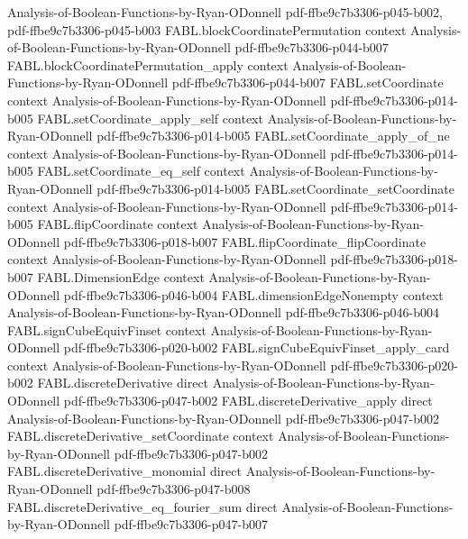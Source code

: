 \begin{theorem}
  {Analysis-of-Boolean-Functions-by-Ryan-ODonnell}
  {pdf-ffbe9c7b3306-p045-b002,
    pdf-ffbe9c7b3306-p045-b003}
\proofstep
  {FABL.blockCoordinatePermutation}
  {context}
  {Analysis-of-Boolean-Functions-by-Ryan-ODonnell}
  {pdf-ffbe9c7b3306-p044-b007}
\proofstep
  {FABL.blockCoordinatePermutation_apply}
  {context}
  {Analysis-of-Boolean-Functions-by-Ryan-ODonnell}
  {pdf-ffbe9c7b3306-p044-b007}
\proofstep
  {FABL.setCoordinate}
  {context}
  {Analysis-of-Boolean-Functions-by-Ryan-ODonnell}
  {pdf-ffbe9c7b3306-p014-b005}
\proofstep
  {FABL.setCoordinate_apply_self}
  {context}
  {Analysis-of-Boolean-Functions-by-Ryan-ODonnell}
  {pdf-ffbe9c7b3306-p014-b005}
\proofstep
  {FABL.setCoordinate_apply_of_ne}
  {context}
  {Analysis-of-Boolean-Functions-by-Ryan-ODonnell}
  {pdf-ffbe9c7b3306-p014-b005}
\proofstep
  {FABL.setCoordinate_eq_self}
  {context}
  {Analysis-of-Boolean-Functions-by-Ryan-ODonnell}
  {pdf-ffbe9c7b3306-p014-b005}
\proofstep
  {FABL.setCoordinate_setCoordinate}
  {context}
  {Analysis-of-Boolean-Functions-by-Ryan-ODonnell}
  {pdf-ffbe9c7b3306-p014-b005}
\proofstep
  {FABL.flipCoordinate}
  {context}
  {Analysis-of-Boolean-Functions-by-Ryan-ODonnell}
  {pdf-ffbe9c7b3306-p018-b007}
\proofstep
  {FABL.flipCoordinate_flipCoordinate}
  {context}
  {Analysis-of-Boolean-Functions-by-Ryan-ODonnell}
  {pdf-ffbe9c7b3306-p018-b007}
\proofstep
  {FABL.DimensionEdge}
  {context}
  {Analysis-of-Boolean-Functions-by-Ryan-ODonnell}
  {pdf-ffbe9c7b3306-p046-b004}
\proofstep
  {FABL.dimensionEdgeNonempty}
  {context}
  {Analysis-of-Boolean-Functions-by-Ryan-ODonnell}
  {pdf-ffbe9c7b3306-p046-b004}
\proofstep
  {FABL.signCubeEquivFinset}
  {context}
  {Analysis-of-Boolean-Functions-by-Ryan-ODonnell}
  {pdf-ffbe9c7b3306-p020-b002}
\proofstep
  {FABL.signCubeEquivFinset_apply_card}
  {context}
  {Analysis-of-Boolean-Functions-by-Ryan-ODonnell}
  {pdf-ffbe9c7b3306-p020-b002}
\proofstep
  {FABL.discreteDerivative}
  {direct}
  {Analysis-of-Boolean-Functions-by-Ryan-ODonnell}
  {pdf-ffbe9c7b3306-p047-b002}
\proofstep
  {FABL.discreteDerivative_apply}
  {direct}
  {Analysis-of-Boolean-Functions-by-Ryan-ODonnell}
  {pdf-ffbe9c7b3306-p047-b002}
\proofstep
  {FABL.discreteDerivative_setCoordinate}
  {context}
  {Analysis-of-Boolean-Functions-by-Ryan-ODonnell}
  {pdf-ffbe9c7b3306-p047-b002}
\proofstep
  {FABL.discreteDerivative_monomial}
  {direct}
  {Analysis-of-Boolean-Functions-by-Ryan-ODonnell}
  {pdf-ffbe9c7b3306-p047-b008}
\proofstep
  {FABL.discreteDerivative_eq_fourier_sum}
  {direct}
  {Analysis-of-Boolean-Functions-by-Ryan-ODonnell}
  {pdf-ffbe9c7b3306-p047-b007}

\end{theorem}
